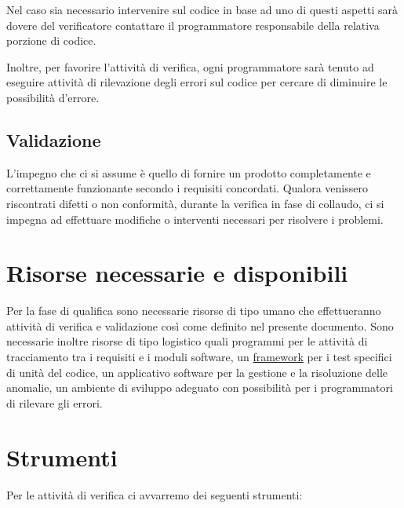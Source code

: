 Nel caso sia necessario intervenire sul codice in base ad uno di questi aspetti
sar\`a dovere del verificatore contattare il programmatore responsabile della
relativa porzione di codice.

Inoltre, per favorire l'attivit\`a di verifica, ogni programmatore sar\`a tenuto
ad eseguire attivit\`a di rilevazione degli errori sul codice per cercare di
diminuire le possibilit\`a d'errore.

\subsection{Validazione}

L'impegno che ci si assume \`e quello di fornire un prodotto completamente e
correttamente funzionante secondo i requisiti concordati. Qualora venissero
riscontrati difetti o non conformit\`a, durante la verifica in fase di collaudo,
ci si impegna ad effettuare modifiche o interventi necessari per risolvere i
problemi.

\section{Risorse necessarie e disponibili}

Per la fase di qualifica sono necessarie risorse di tipo umano che
effettueranno attivit\`a di verifica e validazione cos\`i come definito nel
presente documento. Sono necessarie inoltre risorse di tipo logistico quali
programmi per le attivit\`a di tracciamento tra i requisiti e i moduli software,
un \underline{framework} per i test specifici di unit\`a del codice, un
applicativo software per la gestione e la risoluzione delle anomalie, un ambiente di sviluppo
adeguato con possibilit\`a per i programmatori di rilevare gli errori.


\section{Strumenti}

Per le attivit\`a di verifica ci avvarremo dei seguenti strumenti:

